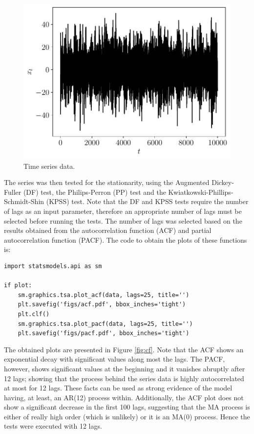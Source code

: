 \documentclass[fleqn]{article}
\begin{document}
\begin{enumerate}
\begin{figure}[H]
    \centering
    \includegraphics[scale=0.6]{figs/ts.pdf}
    \caption{Time series data.}
    \label{fig:ts}
\end{figure}
\end{enumerate}

The series was then tested for the stationarity, using the Augmented Dickey-Fuller (DF) test, the Philips-Perron (PP) test and the Kwiatkowski-Phillips-Schmidt-Shin (KPSS) test. Note that the DF and KPSS tests require the number of lags as an input parameter, therefore an appropriate number of lags must be selected before running the tests. The number of lags was selected based on the results obtained from the autocorrelation function (ACF) and partial autocorrelation function (PACF). The code to obtain the plots of these functions is:
\begin{verbatim}
import statsmodels.api as sm

if plot:
    sm.graphics.tsa.plot_acf(data, lags=25, title='')
    plt.savefig('figs/acf.pdf', bbox_inches='tight')
    plt.clf()
    sm.graphics.tsa.plot_pacf(data, lags=25, title='')
    plt.savefig('figs/pacf.pdf', bbox_inches='tight')
\end{verbatim}
The obtained plots are presented in Figure \ref{fig:cf}. Note that the ACF shows an exponential decay with significant values along most the lags. The PACF, however, shows significant values at the beginning and it vanishes abruptly after 12 lags; showing that the process behind the series data is highly autocorrelated at most for 12 lags. These facts can be used as strong evidence of the model having, at least, an AR(12) process within. Additionally, the ACF plot does not show a significant decrease in the first 100 lags, suggesting that the MA process is either of really high order (which is unlikely) or it is an MA(0) process. Hence the tests were executed with 12 lags.
\end{document}
